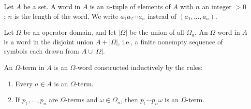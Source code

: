 Let $A$ be a set. A word in $A$ is an $n$-tuple of elements of $A$ with $n$ an integer $> 0$; $n$ is the length of the word. We write $a_1 a_2 \cdots a_n$ instead of $(a_1, \ldots, a_n)$.

Let $\Omega$ be an operator domain, and let $|\Omega|$ be the union of all $\Omega_n$. An $\Omega$-word in $A$ is a word in the disjoint union $A + |\Omega|$, i.e., a finite nonempty sequence of symbols each drawn from $A \cup |\Omega|$.

An $\Omega$-term in $A$ is an $\Omega$-word constructed inductively by the rules:
\begin{enumerate}
\item Every $a \in A$ is an $\Omega$-term.
\item If $p_1, \ldots, p_n$ are $\Omega$-terms and $\omega \in \Omega_n$, then $p_1 \cdots p_n \omega$ is an $\Omega$-term.
\end{enumerate}
